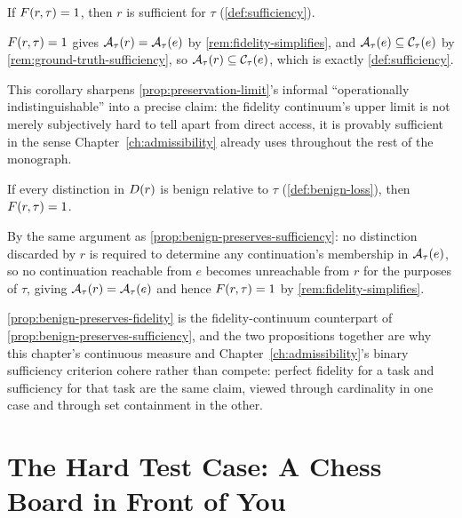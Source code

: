 \begin{corollary}
\label{cor:fidelity-implies-sufficiency}
If $F(r,\tau) = 1$, then $r$ is sufficient for $\tau$
(\cref{def:sufficiency}).
\end{corollary}

\begin{proofsketch}
$F(r,\tau)=1$ gives $\mathcal{A}_{\tau}(r) = \mathcal{A}_{\tau}(e)$ by
\cref{rem:fidelity-simplifies}, and $\mathcal{A}_{\tau}(e) \subseteq
\mathcal{C}_\tau(e)$ by \cref{rem:ground-truth-sufficiency}, so
$\mathcal{A}_{\tau}(r) \subseteq \mathcal{C}_\tau(e)$, which is exactly
\cref{def:sufficiency}.
\end{proofsketch}

This corollary sharpens \cref{prop:preservation-limit}'s informal
``operationally indistinguishable'' into a precise claim: the fidelity
continuum's upper limit is not merely subjectively hard to tell apart
from direct access, it is provably sufficient in the sense
Chapter~\ref{ch:admissibility} already uses throughout the rest of the
monograph.

\begin{proposition}
\label{prop:benign-preserves-fidelity}
If every distinction in $D(r)$ is benign relative to $\tau$
(\cref{def:benign-loss}), then $F(r,\tau) = 1$.
\end{proposition}

\begin{proofsketch}
By the same argument as \cref{prop:benign-preserves-sufficiency}: no
distinction discarded by $r$ is required to determine any continuation's
membership in $\mathcal{A}_{\tau}(e)$, so no continuation reachable from $e$
becomes unreachable from $r$ for the purposes of $\tau$, giving
$\mathcal{A}_{\tau}(r) = \mathcal{A}_{\tau}(e)$ and hence
$F(r,\tau) = 1$ by \cref{rem:fidelity-simplifies}.
\end{proofsketch}

\cref{prop:benign-preserves-fidelity} is the fidelity-continuum
counterpart of \cref{prop:benign-preserves-sufficiency}, and the two
propositions together are why this chapter's continuous measure and
Chapter~\ref{ch:admissibility}'s binary sufficiency criterion cohere
rather than compete: perfect fidelity for a task and sufficiency for that
task are the same claim, viewed through cardinality in one case and
through set containment in the other.

\section{The Hard Test Case: A Chess Board in Front of You}

